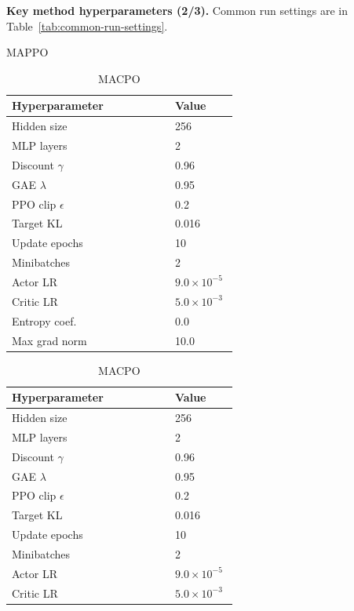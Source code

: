 \documentclass{article}
\theoremstyle{plain}
\theoremstyle{definition}
\theoremstyle{remark}
\begin{document}
\clearpage
\begin{table}[t]
\caption{\textbf{Key method hyperparameters (2/3).} Common run settings are in Table~\ref{tab:common-run-settings}.}
\label{tab:hparams-page2}
\centering
\begin{subtable}[t]{0.48\textwidth}
\caption{\textsc{MAPPO}}
\label{tab:hparams-mappo}
\centering
\scriptsize
\setlength{\tabcolsep}{4pt}
\renewcommand{\arraystretch}{1.08}
\begin{tabular}{@{}p{0.68\linewidth}p{0.26\linewidth}@{}}
\toprule
\textbf{Hyperparameter} & \textbf{Value} \\
\midrule
Hidden size & 256 \\
MLP layers & 2 \\
Discount $\gamma$ & 0.96 \\
GAE $\lambda$ & 0.95 \\
PPO clip $\epsilon$ & 0.2 \\
Target KL & 0.016 \\
Update epochs & 10 \\
Minibatches & 2 \\
Actor LR & $9.0\times 10^{-5}$ \\
Critic LR & $5.0\times 10^{-3}$ \\
Entropy coef. & 0.0 \\
Max grad norm & 10.0 \\
\bottomrule
\end{tabular}
\end{subtable}\hfill
\begin{subtable}[t]{0.48\textwidth}
\caption{\textsc{MACPO}}
\label{tab:hparams-macpo}
\centering
\scriptsize
\setlength{\tabcolsep}{4pt}
\renewcommand{\arraystretch}{1.08}
\begin{tabular}{@{}p{0.68\linewidth}p{0.26\linewidth}@{}}
\toprule
\textbf{Hyperparameter} & \textbf{Value} \\
\midrule
Hidden size & 256 \\
MLP layers & 2 \\
Discount $\gamma$ & 0.96 \\
GAE $\lambda$ & 0.95 \\
PPO clip $\epsilon$ & 0.2 \\
Target KL & 0.016 \\
Update epochs & 10 \\
Minibatches & 2 \\
Actor LR & $9.0\times 10^{-5}$ \\
Critic LR & $5.0\times 10^{-3}$ \\

\end{tabular}
\end{subtable}
\end{table}
\end{document}
